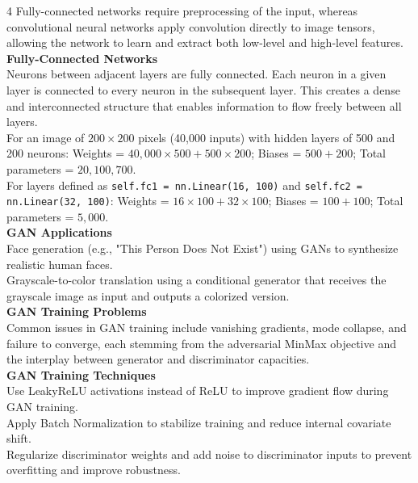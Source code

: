 \documentclass[8pt]{extarticle}
\begin{document}
\begin{multicols}{4}
Fully-connected networks require preprocessing of the input, whereas convolutional neural networks apply convolution directly to image tensors, allowing the network to learn and extract both low-level and high-level features.\\
\vspace{2pt}\textbf{Fully-Connected Networks}\\
Neurons between adjacent layers are fully connected. Each neuron in a given layer is connected to every neuron in the subsequent layer. This creates a dense and interconnected structure that enables information to flow freely between all layers.\\
For an image of $200\times200$ pixels (40,000 inputs) with hidden layers of 500 and 200 neurons: Weights = $40{,}000\times500 + 500\times200$; Biases = $500 + 200$; Total parameters = $20{,}100{,}700$.\\
For layers defined as \texttt{self.fc1 = nn.Linear(16, 100)} and \texttt{self.fc2 = nn.Linear(32, 100)}: Weights = $16\times100 + 32\times100$; Biases = $100 + 100$; Total parameters = $5{,}000$.\\
\vspace{2pt}\textbf{GAN Applications}\\
Face generation (e.g., "This Person Does Not Exist") using GANs to synthesize realistic human faces.\\
Grayscale-to-color translation using a conditional generator that receives the grayscale image as input and outputs a colorized version.\\
\vspace{2pt}\textbf{GAN Training Problems}\\
Common issues in GAN training include vanishing gradients, mode collapse, and failure to converge, each stemming from the adversarial MinMax objective and the interplay between generator and discriminator capacities.\\
\vspace{2pt}\textbf{GAN Training Techniques}\\
Use LeakyReLU activations instead of ReLU to improve gradient flow during GAN training.\\
Apply Batch Normalization to stabilize training and reduce internal covariate shift.\\
Regularize discriminator weights and add noise to discriminator inputs to prevent overfitting and improve robustness.\\


\end{multicols}
\end{document}
